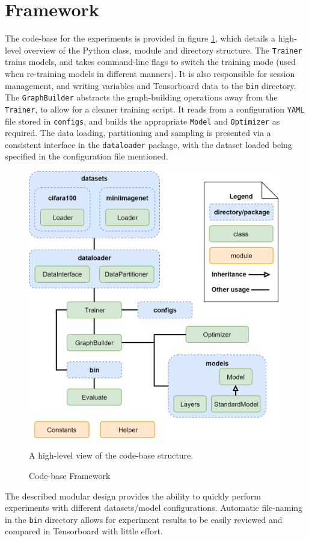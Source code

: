 \documentclass{report}
\begin{document}
	\section{Framework}
	The code-base for the experiments is provided in figure \ref{fig:framework:1}, which details a high-level overview of the Python class, module and directory structure. The \texttt{Trainer} trains models, and takes command-line flags to switch the training mode (used when re-training models in different manners). It is also responsible for session management, and writing variables and Tensorboard data to the \texttt{bin} directory. The \texttt{GraphBuilder} abstracts the graph-building operations away from the \texttt{Trainer}, to allow for a cleaner training script. It reads from a configuration \texttt{YAML} file stored in \texttt{configs}, and builds the appropriate \texttt{Model} and \texttt{Optimizer} as required. The data loading, partitioning and sampling is presented via a consistent interface in the \texttt{dataloader} package, with the dataset loaded being specified in the configuration file mentioned. \\
	\begin{figure}[h]
		\centering
		\includegraphics[width=11cm]{codeframework}
		\caption{Code-base Framework}
		A high-level view of the code-base structure. 
		\label{fig:framework:1}
	\end{figure}
	The described modular design provides the ability to quickly perform experiments with different datasets/model configurations. Automatic file-naming in the \texttt{bin} directory allows for experiment results to be easily reviewed and compared in Tensorboard with little effort. \par
	
\end{document}
